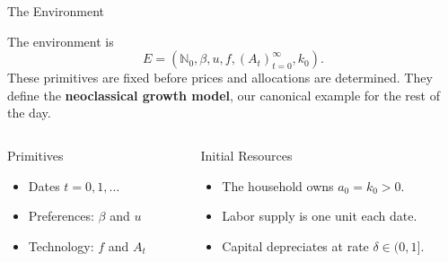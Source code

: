 \documentclass[11pt,aspectratio=169,c]{beamer}
\begin{document}
\begin{frame}{The Environment}
  \begin{definitionbox}
    The environment is
    \[
      E=
      \left(
        \mathbb{N}_0,\beta,u,f,(A_t)_{t=0}^{\infty},k_0
      \right).
    \]
    These primitives are fixed before prices and allocations are determined.
    They define the \textbf{neoclassical growth model}, our canonical example
    for the rest of the day.
  \end{definitionbox}

  \begin{columns}[t,onlytextwidth]
    \begin{column}{\tightcolumnwidth}
      \begin{block}{Primitives}
        \begin{minipage}[t][1.95cm][t]{\dimexpr\linewidth-.76em\relax}
          \begin{itemize}
            \item Dates $t=0,1,\ldots$
            \item Preferences: $\beta$ and $u$
            \item Technology: $f$ and $A_t$
          \end{itemize}
        \end{minipage}
      \end{block}
    \end{column}
    \hspace{\twocolumngutter}
    \begin{column}{\tightcolumnwidth}
      \begin{block}{Initial Resources}
        \begin{minipage}[t][1.95cm][t]{\dimexpr\linewidth-.76em\relax}
          \begin{itemize}
            \item The household owns $a_0=k_0>0$.
            \item Labor supply is one unit each date.
            \item Capital depreciates at rate $\delta\in(0,1]$.
          \end{itemize}
        \end{minipage}
      \end{block}
    \end{column}
  \end{columns}
\end{frame}
\end{document}
